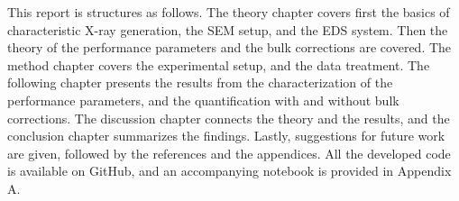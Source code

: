 This report is structures as follows. 
The theory chapter covers first the basics of characteristic X-ray generation, the SEM setup, and the EDS system.
Then the theory of the performance parameters and the bulk corrections are covered.
The method chapter covers the experimental setup, and the data treatment.
The following chapter presents the results from the characterization of the performance parameters, and the quantification with and without bulk corrections.
The discussion chapter connects the theory and the results, and the conclusion chapter summarizes the findings.
Lastly, suggestions for future work are given, followed by the references and the appendices.
All the developed code is available on GitHub, and an accompanying notebook is provided in Appendix A.









